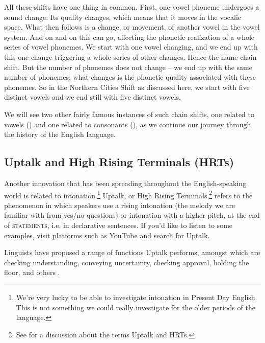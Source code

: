 All these shifts have one thing in common. First, one vowel phoneme undergoes a sound change. Its quality changes, which means that it moves in the vocalic space. What then follows is a change, or movement, of another vowel in the vowel system. And on and on this can go, affecting the phonetic realization of a whole series of vowel phonemes. We start with one vowel changing, and we end up with this one change triggering a whole series of other changes. Hence the name chain shift. But the number of phonemes does not change -- we end up with the same number of phonemes; what changes is the phonetic quality associated with these phonemes. So in the Northern Cities Shift as discussed here, we start with five distinct vowels and we end still with five distinct vowels.

We will see two other fairly famous instances of such chain shifts, one related to vowels () and one related to consonants (), as we continue our journey through the history of the English language.

\subsection{Uptalk and High Rising Terminals (HRTs)}\label{HRT}
Another innovation that has been spreading throughout the English-speaking world is related to intonation.\footnote{We're very lucky to be able to investigate intonation in Present Day English. This is not something we could really investigate for the older periods of the language.} Uptalk, or High Rising Terminals,\footnote{See \citet[4--7]{Warren2016} for a discussion about the terms Uptalk and HRTs.} refers to the phenomenon in which speakers use a rising intonation (the melody we are familiar with from yes/no-questions) or intonation with a higher pitch, at the end of \textsc{statements}, i.e. in declarative sentences. If you'd like to listen to some examples, visit platforms such as YouTube and search for Uptalk.

Linguists have proposed a range of functions Uptalk performs, amongst which are checking understanding, conveying uncertainty, checking approval, holding the floor, and others \citep{McLemore1991}.

